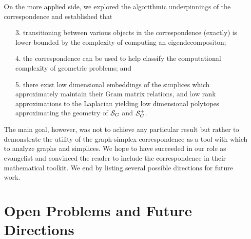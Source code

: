 On the more applied side,  we explored the  algorithmic underpinnings  of  the correspondence and established that 
\begin{enumerate}
	\item[3.] transitioning between various objects in the correspondence (exactly) is lower bounded  by the complexity of computing an eigendecompositon; 
	\item[4.] the correspondence can be used to help classify the computational complexity of geometric problems; and 
	\item[5.] there exist low dimensional  embeddings of the simplices which approximately maintain their Gram matrix relations, and low rank  approximations to the Laplacian yielding low dimensional polytopes approximating the geometry  of $\mathcal{S}_G$ and $\mathcal{S}_G^+$. 
\end{enumerate}
The main goal,  however,  was not to achieve any particular result but rather to demonstrate the utility of  the graph-simplex correspondence as  a tool with which  to  analyze  graphs and simplices. We hope to have succeeded in our role as evangelist and  convinced the reader to include the correspondence in their mathematical toolkit. We end  by listing several possible directions for future work. 

\section{Open Problems and Future Directions}
\label{sec:open_problems}

